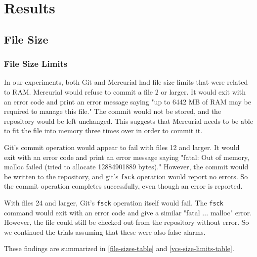 \section{Results}

\subsection{File Size}

\subsubsection{File Size Limits}


In our experiments, both Git and Mercurial had file size limits that were related to RAM.
Mercurial would refuse to commit a file \SI{2}{\gib} or larger.
It would exit with an error code and print an error message saying "up to 6442 MB of RAM may be required to manage this file."
The commit would not be stored, and the repository would be left unchanged.
This suggests that Mercurial needs to be able to fit the file into memory three times over in order to commit it.

Git's commit operation would appear to fail with files \SI{12}{\gib} and larger.
It would exit with an error code and print an error message saying "fatal: Out of memory, malloc failed (tried to allocate 12884901889 bytes)."
However, the commit would be written to the repository, and git's \lstinline{fsck} operation would report no errors.
So the commit operation completes successfully, even though an error is reported.

With files \SI{24}{\gib} and larger, Git's \lstinline{fsck} operation itself would fail.
The \lstinline{fsck} command would exit with an error code and give a similar "fatal ... malloc" error.
However, the file could still be checked out from the repository without error.
So we continued the trials assuming that these were also false alarms.

These findings are summarized in \autoref{file-sizes-table} and
\autoref{vcs-size-limits-table}.

